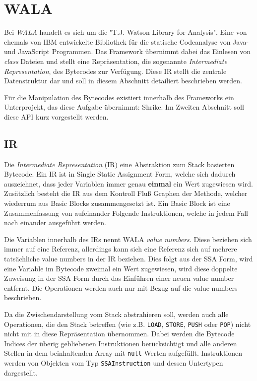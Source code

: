 \section{WALA}

Bei \textit{WALA} handelt es sich um die "T.J. Watson Library for Analysis". Eine von ehemals von IBM 
entwickelte Bibliothek für die statische Codeanalyse von Java- und JavaScript Programmen. Das Framework 
übernimmt dabei das Einlesen von \textit{class} Dateien und stellt eine Repräsentation, die sogenannte 
\textit{Intermediate Representation}, des Bytecodes zur Verfügung. Diese IR stellt die zentrale 
Datenstruktur dar und soll in diesem Abschnitt detailiert beschrieben werden.

Für die Manipulation des Bytecodes existiert innerhalb des Frameworks ein Unterprojekt, das diese Aufgabe 
übernimmt: Shrike. Im Zweiten Abschnitt soll diese API kurz vorgestellt werden.  

\subsection{IR}

Die \textit{Intermediate Representation} (IR) eine Abstraktion zum Stack basierten Bytecode. Ein IR ist
in Single Static Assignment Form, welche sich dadurch auszeichnet, dass jeder Variablen immer genau 
\textbf{einmal} ein Wert zugewiesen wird. Zusätzlich besteht die IR aus dem Kontroll Fluß Graphen der 
Methode, welcher wiederrum aus Basic Blocks zusammengesetzt ist. Ein Basic Block ist eine Zusammenfassung 
von aufeinander Folgende Instruktionen, welche in jedem Fall nach einander ausgeführt werden.

Die Variablen innerhalb des IRs nennt WALA \textit{value numbers}. Diese beziehen sich immer auf eine 
Referenz, allerdings kann sich eine Referenz sich auf mehrere tatsächliche value numbers in der IR beziehen.
Dies folgt aus der SSA Form, wird eine Variable im Bytecode zweimal ein Wert zugewiesen, wird diese 
doppelte Zuweisung in der SSA Form durch das Einführen einer neuen value number entfernt. Die Operationen
werden auch nur mit Bezug auf die value numbers beschrieben.   
 
Da die Zwischendarstellung vom Stack abstrahieren soll, werden auch alle Operationen, die den Stack betreffen
(wie z.B. \texttt{LOAD}, \texttt{STORE}, \texttt{PUSH} oder \texttt{POP}) nicht nicht mit in diese 
Repräsentation übernommen. Dabei werden die Bytecode Indices der überig gebliebenen Instruktionen 
berücksichtigt und alle anderen Stellen in dem beinhaltenden Array mit \texttt{null} Werten aufgefüllt.
Instruktionen werden von Objekten vom Typ \texttt{SSAInstruction} und dessen Untertypen dargestellt.

